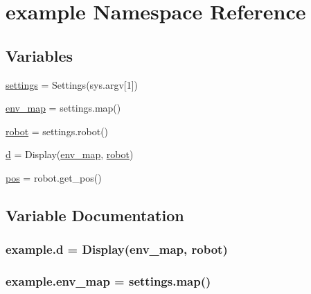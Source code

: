 \hypertarget{namespaceexample}{}\section{example Namespace Reference}
\label{namespaceexample}
\subsection*{Variables}
\begin{DoxyCompactItemize}
\item 
\hyperlink{namespaceexample_a6cd613635d5a55d6581257e66788bc9f}{settings} = Settings(sys.\+argv\mbox{[}1\mbox{]})
\item 
\hyperlink{namespaceexample_ada50407384213a34623bcb5dc118a23d}{env\+\_\+map} = settings.\+map()
\item 
\hyperlink{namespaceexample_aa3d3ac45bdbbaf45b505e0e8a34ad8c3}{robot} = settings.\+robot()
\item 
\hyperlink{namespaceexample_a6f1f6028b3f2b72fea70da4447a4d5ad}{d} = Display(\hyperlink{namespaceexample_ada50407384213a34623bcb5dc118a23d}{env\+\_\+map}, \hyperlink{namespaceexample_aa3d3ac45bdbbaf45b505e0e8a34ad8c3}{robot})
\item 
\hyperlink{namespaceexample_a6d45a526abbb9e997551bc8421251383}{pos} = robot.\+get\+\_\+pos()
\end{DoxyCompactItemize}


\subsection{Variable Documentation}
\subsubsection[{\texorpdfstring{d}{d}}]{\setlength{\rightskip}{0pt plus 5cm}example.\+d = Display({\bf env\+\_\+map}, {\bf robot})}\hypertarget{namespaceexample_a6f1f6028b3f2b72fea70da4447a4d5ad}{}\label{namespaceexample_a6f1f6028b3f2b72fea70da4447a4d5ad}
\subsubsection[{\texorpdfstring{env\+\_\+map}{env_map}}]{\setlength{\rightskip}{0pt plus 5cm}example.\+env\+\_\+map = settings.\+map()}\hypertarget{namespaceexample_ada50407384213a34623bcb5dc118a23d}{}\label{namespaceexample_ada50407384213a34623bcb5dc118a23d}
